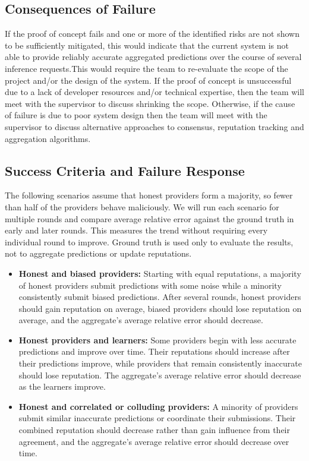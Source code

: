 \documentclass{article}
\begin{document}
\subsection{Consequences of Failure}
If the proof of concept fails and one or more of the identified risks are not shown to be sufficiently
mitigated, this would indicate that the current system is not able to provide reliably accurate
aggregated predictions over the course of several inference requests.This would require the team to re-evaluate the scope of the project and/or the design of the system.
If the proof of concept is unsuccessful due to a lack of developer resources and/or technical expertise,
then the team will meet with the supervisor to discuss shrinking the scope. Otherwise, if the cause of
failure is due to poor system design then the team will meet with the supervisor to
discuss alternative approaches to consensus, reputation tracking and aggregation algorithms.

\subsection{Success Criteria and Failure Response}

The following scenarios assume that honest providers form a majority, so fewer than half of the providers behave maliciously. We will run each scenario for multiple rounds and compare average relative error against the ground truth in early and later rounds. This measures the trend without requiring every individual round to improve. Ground truth is used only to evaluate the results, not to aggregate predictions or update reputations.

{\begin{itemize}
    \item \textbf{Honest and biased providers:} Starting with equal reputations, a majority of honest providers submit predictions with some noise while a minority consistently submit biased predictions. After several rounds, honest providers should gain reputation on average, biased providers should lose reputation on average, and the aggregate's average relative error should decrease.
    \item \textbf{Honest providers and learners:} Some providers begin with less accurate predictions and improve over time. Their reputations should increase after their predictions improve, while providers that remain consistently inaccurate should lose reputation. The aggregate's average relative error should decrease as the learners improve.
    \item \textbf{Honest and correlated or colluding providers:} A minority of providers submit similar inaccurate predictions or coordinate their submissions. Their combined reputation should decrease rather than gain influence from their agreement, and the aggregate's average relative error should decrease over time.
\end{itemize}}
\end{document}
